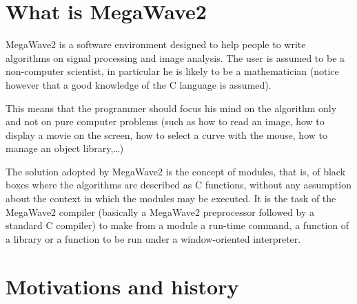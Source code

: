 %
%

\section{What is MegaWave2}
\label{intro_what-is}

MegaWave2 is a software environment designed to help people
to write algorithms on signal processing and image analysis.
The user is assumed to be a non-computer scientist, 
in particular he is likely to be a mathematician 
(notice however that a good knowledge of the C language is assumed).

This means that the programmer should focus his mind on the algorithm only and not on pure computer problems (such as how to read an image, how to display a movie on the screen, how to select a curve with the mouse, how to manage an object library,\ldots)

The solution adopted by MegaWave2 is the concept of modules, that is, of black boxes where the algorithms are described as C functions, without any assumption about the context in which the modules may be executed.
It is the task of the MegaWave2 compiler (basically a MegaWave2 preprocessor followed by a standard C compiler) to make from a module a run-time command, a function of a library or a function to be run under a window-oriented interpreter.


\section{Motivations and history}
\label{intro_historic}

